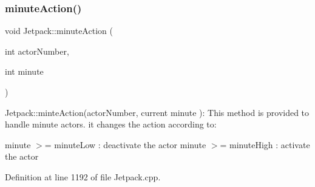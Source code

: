\mbox{\label{class_jetpack_a97da41141c7b53ddee61143519c8d17d}} 
\subsubsection{\texorpdfstring{minute\+Action()}{minuteAction()}}
{\footnotesize\ttfamily void Jetpack\+::minute\+Action (\begin{DoxyParamCaption}\item[{int}]{actor\+Number,  }\item[{int}]{minute }\end{DoxyParamCaption})}

Jetpack\+::minte\+Action(actor\+Number, current minute )\+: This method is provided to handle minute actors. it changes the action according to\+:

minute $>$= minute\+Low \+: deactivate the actor minute $>$= minute\+High \+: activate the actor 

Definition at line 1192 of file Jetpack.\+cpp.


